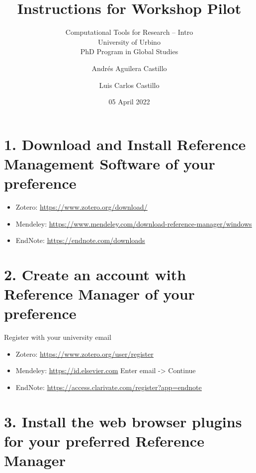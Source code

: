 \documentclass[
]{article}
\title{Instructions for Workshop Pilot}
\subtitle{Computational Tools for Research -- Intro\\
University of Urbino\\
PhD Program in Global Studies}
\author{Andrés Aguilera Castillo \and Luis Carlos Castillo}
\date{05 April 2022}
\begin{document}
\maketitle

\hypertarget{download-and-install-reference-management-software-of-your-preference}{%
\section{1. Download and Install Reference Management Software of your
preference}\label{download-and-install-reference-management-software-of-your-preference}}

\begin{itemize}
\item
  Zotero:
  \href{https://www.zotero.org/download/}{\underline{https://www.zotero.org/download/}}
\item
  Mendeley:
  \href{https://www.mendeley.com/download-reference-manager/windows}{\underline{https://www.mendeley.com/download-reference-manager/windows}}
\item
  EndNote:
  \href{https://endnote.com/downloads}{\underline{https://endnote.com/downloads}}
\end{itemize}

\hypertarget{create-an-account-with-reference-manager-of-your-preference}{%
\section{2. Create an account with Reference Manager of your
preference}\label{create-an-account-with-reference-manager-of-your-preference}}

Register with your university email

\begin{itemize}
\item
  Zotero:
  \href{https://www.zotero.org/user/register}{\underline{https://www.zotero.org/user/register}}
\item
  Mendeley:
  \href{https://id.elsevier.com}{\underline{https://id.elsevier.com}}
  Enter email -\textgreater{} Continue
\item
  EndNote:
  \href{https://access.clarivate.com/register?app=endnote}{\underline{https://access.clarivate.com/register?app=endnote}}
\end{itemize}

\hypertarget{install-the-web-browser-plugins-for-your-preferred-reference-manager}{%
\section{3. Install the web browser plugins for your preferred Reference
Manager}\label{install-the-web-browser-plugins-for-your-preferred-reference-manager}}
\end{document}
